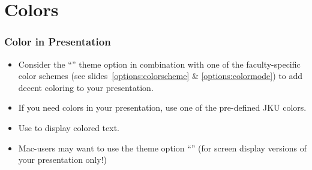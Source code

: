 \documentclass[utf8,aspectratio=169,ngerman,english]{beamer}
\begin{document}
\section{Colors}

\begin{frame}
\frametitle{Color in Presentation}

\begin{itemize}
\item Consider the ``'' theme option in combination with one of the faculty-specific color schemes (see slides~\ref{options:colorscheme} \& \ref{options:colormode}) to add decent coloring to your presentation.
\item If you need colors in your presentation, use one of the pre-defined JKU colors.
\item Use  to display colored text.
\item Mac-users may want to use the theme option ``'' (for screen display versions of your presentation only!)
\end{itemize}
\end{frame}
\end{document}

